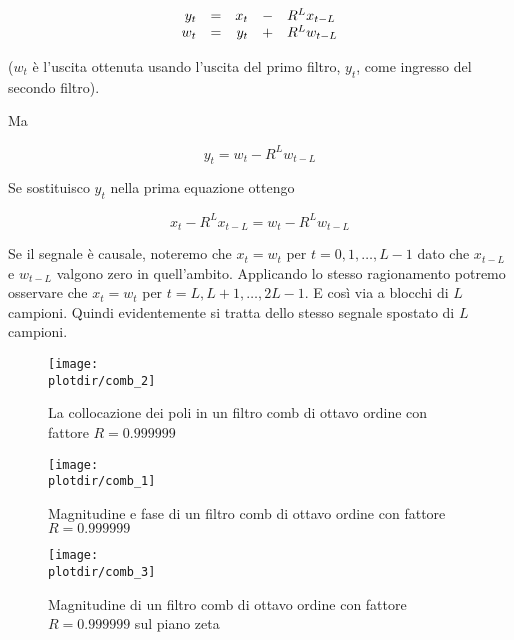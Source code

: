 \begin{equation}
  \begin{array}{r c r c l}
	  y_t & = & x_t & - & R^{L} x_{t-L}\\
		w_t & = & y_t & + & R^{L} w_{t-L}\\
	\end{array}
\end{equation}

($w_t$ \`e l'uscita ottenuta usando l'uscita del primo filtro, $y_t$, come
ingresso del secondo filtro).

Ma

\begin{equation}
  y_t = w_t - R^{L} w_{t-L}
\end{equation}

Se sostituisco $y_t$ nella prima equazione ottengo

\begin{equation}
	x_t - R^{L} x_{t-L} = w_t - R^{L} w_{t-L}
\end{equation}

Se il segnale \`e causale, noteremo che $x_t = w_t$
per $t = 0, 1, \dots , L - 1$ dato che $x_{t - L}$ e $w_{t - L}$
valgono zero in quell'ambito.
Applicando lo stesso ragionamento potremo osservare che
$x_t = w_t$ per $t = L, L + 1, \dots, 2 L - 1$. E cos\`i via a blocchi di $L$
campioni. Quindi evidentemente si tratta dello stesso segnale spostato di $L$
campioni.

\begin{figure}[htbp]
	\begin{center}
	\texttt{[image: \\plotdir/comb\_2]}
	\caption{La collocazione dei poli in un filtro comb di ottavo ordine con
	fattore $R = 0.999999$\label{fig:comb poles}}
	\end{center}
\end{figure}

\begin{figure}[htbp]
	\begin{center}
	\texttt{[image: \\plotdir/comb\_1]}
	\caption{Magnitudine e fase di un filtro comb di ottavo ordine con
	fattore $R = 0.999999$\label{fig:comb magnitude and phase}}
	\end{center}
\end{figure}

\begin{figure}[htbp]
	\begin{center}
	\texttt{[image: \\plotdir/comb\_3]}
	\caption{Magnitudine di un filtro comb di ottavo ordine con
	fattore $R = 0.999999$ sul piano zeta\label{fig:comb z-plane poles}}
	\end{center}
\end{figure}

